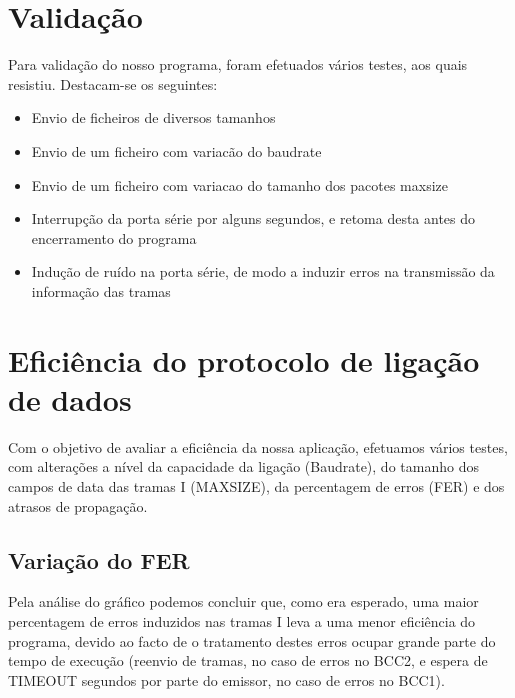 \documentclass[article, a4paper, 11pt, oneside]{memoir}
\begin{document}
\chapter[Validação][Validação]{Validação} \label{\thechapter}

Para validação do nosso programa, foram efetuados vários testes, aos quais resistiu. Destacam-se os seguintes:

\begin{itemize}
	\item Envio de ficheiros de diversos tamanhos
	\item Envio de um ficheiro com variacão do baudrate
	\item Envio de um ficheiro com variacao do tamanho dos pacotes max\textunderscore size
	\item Interrupção da porta série por alguns segundos, e retoma desta antes do encerramento do programa
	\item Indução de ruído na porta série, de modo a induzir erros na transmissão da informação das tramas
\end{itemize}

\chapter[Eficiência do protocolo de ligação de dados][Eficiência do protocolo de ligação de dados]{Eficiência do protocolo de ligação de dados} \label{\thechapter}

Com o objetivo de avaliar a eficiência da nossa aplicação, efetuamos vários testes, com alterações a nível da capacidade
da ligação (Baudrate), do tamanho dos campos de data das tramas I (MAX\textunderscore SIZE), da percentagem de erros (FER) e dos atrasos de propagação.

\section{Variação do FER}

Pela análise do gráfico podemos concluir que, como era esperado, uma maior percentagem de erros
induzidos nas tramas I leva a uma menor eficiência do programa, devido ao facto de o tratamento destes erros ocupar grande parte do tempo de execução
(reenvio de tramas, no caso de erros no BCC2, e espera de TIMEOUT segundos por parte do emissor, no caso de erros no BCC1).
\end{document}
